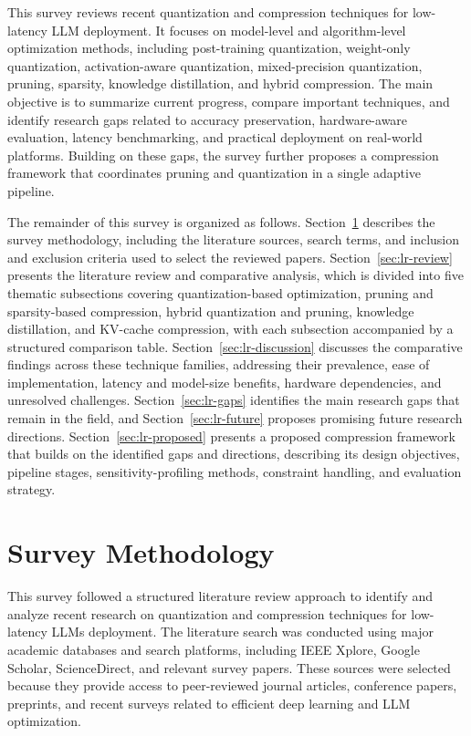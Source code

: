 \documentclass[
11pt, %
english, %
singlespacing, %
headsepline, %
]{MastersDoctoralThesis} %
\begin{document}
This survey reviews recent quantization and compression techniques for low-latency LLM deployment. It focuses on model-level and algorithm-level optimization methods, including post-training quantization, weight-only quantization, activation-aware quantization, mixed-precision quantization, pruning, sparsity, knowledge distillation, and hybrid compression. The main objective is to summarize current progress, compare important techniques, and identify research gaps related to accuracy preservation, hardware-aware evaluation, latency benchmarking, and practical deployment on real-world platforms. Building on these gaps, the survey further proposes a compression framework that coordinates pruning and quantization in a single adaptive pipeline.

The remainder of this survey is organized as follows. Section~\ref{sec:lr-method} describes the survey methodology, including the literature sources, search terms, and inclusion and exclusion criteria used to select the reviewed papers. Section~\ref{sec:lr-review} presents the literature review and comparative analysis, which is divided into five thematic subsections covering quantization-based optimization, pruning and sparsity-based compression, hybrid quantization and pruning, knowledge distillation, and KV-cache compression, with each subsection accompanied by a structured comparison table. Section~\ref{sec:lr-discussion} discusses the comparative findings across these technique families, addressing their prevalence, ease of implementation, latency and model-size benefits, hardware dependencies, and unresolved challenges. Section~\ref{sec:lr-gaps} identifies the main research gaps that remain in the field, and Section~\ref{sec:lr-future} proposes promising future research directions. Section~\ref{sec:lr-proposed} presents a proposed compression framework that builds on the identified gaps and directions, describing its design objectives, pipeline stages, sensitivity-profiling methods, constraint handling, and evaluation strategy.

\section{Survey Methodology}
\label{sec:lr-method}

This survey followed a structured literature review approach to identify and analyze recent research on quantization and compression techniques for low-latency LLMs deployment. The literature search was conducted using major academic databases and search platforms, including IEEE Xplore, Google Scholar, ScienceDirect, and relevant survey papers. These sources were selected because they provide access to peer-reviewed journal articles, conference papers, preprints, and recent surveys related to efficient deep learning and LLM optimization.
\end{document}
